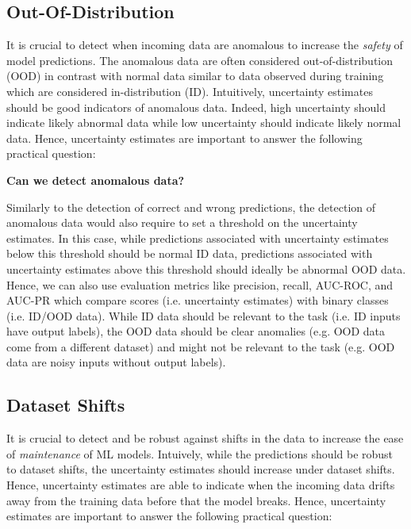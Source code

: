 \subsection{Out-Of-Distribution}

It is crucial to detect when incoming data are anomalous to increase the \emph{safety} of model predictions. The anomalous data are often considered out-of-distribution (OOD) in contrast with normal data similar to data observed during training which are considered in-distribution (ID). Intuitively, uncertainty estimates should be good indicators of anomalous data. Indeed, high uncertainty should indicate likely abnormal data while low uncertainty should indicate likely normal data. Hence, uncertainty estimates are important to answer the following practical question:

\begin{center}
    \textbf{Can we detect anomalous data?}
\end{center}

Similarly to the detection of correct and wrong predictions, the detection of anomalous data would also require to set a threshold on the uncertainty estimates. In this case, while predictions associated with uncertainty estimates below this threshold should be normal ID data, predictions associated with uncertainty estimates above this threshold should ideally be abnormal OOD data. Hence, we can also use evaluation metrics like precision, recall, AUC-ROC, and AUC-PR which compare scores (i.e. uncertainty estimates) with binary classes (i.e. ID/OOD data). While ID data should be relevant to the task (i.e. ID inputs have output labels), the OOD data should be clear anomalies (e.g. OOD data come from a different dataset) and might not be relevant to the task (e.g. OOD data are noisy inputs without output labels).

\subsection{Dataset Shifts}

It is crucial to detect and be robust against shifts in the data to increase the ease of \emph{maintenance} of ML models. Intuively, while the predictions should be robust to dataset shifts, the uncertainty estimates should increase under dataset shifts. Hence, uncertainty estimates are able to indicate when the incoming data drifts away from the training data before that the model breaks. Hence, uncertainty estimates are important to answer the following practical question:

